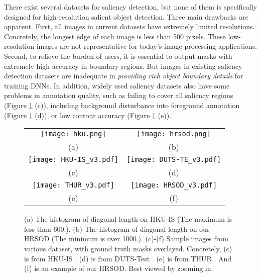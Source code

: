 \documentclass[10pt,twocolumn,letterpaper]{article}
\begin{document}
There exist several datasets for saliency detection, but none of them is specifically designed for high-resolution salient object detection. Three main drawbacks are apparent. First, all images in current datasets have extremely limited resolutions. Concretely, the longest edge of each image is less than 500 pixels. These low-resolution images are not representative
for today's image processing applications.
Second, to relieve the burden of users, it is essential to output masks with extremely high accuracy in boundary regions. But images in existing saliency detection datasets are inadequate in \emph{providing rich object boundary details} for training DNNs. In addition, widely used saliency datasets also have some problems in annotation quality, such as failing to cover all saliency regions (Figure \ref{fig:datset} (c)), including background disturbance into foreground annotation (Figure \ref{fig:datset} (d)), or low contour accuracy (Figure \ref{fig:datset} (e)).
\begin{figure}[!t]
    \centering
    \hspace{-2mm}
        \begin{tabular}{c@{\hspace{0.5mm}} c@{\hspace{0.5mm}}}
\texttt{[image: hku.png]}&
            \texttt{[image: hrsod.png]}\\
            (a)&(b)\\
            \texttt{[image: HKU-IS\_v3.pdf]}&
            \texttt{[image: DUTS-TE\_v3.pdf]}\\
            (c)&(d)\\
            \texttt{[image: THUR\_v3.pdf]}&
            \texttt{[image: HRSOD\_v3.pdf]}\\
            (e)&(f)\\
        \end{tabular}
\caption{(a) The histogram of diagonal length on HKU-IS \cite{li2015visual} (The maximum is less than 600.). (b) The histogram of diagonal length on our HRSOD (The minimum is over 1000.). (c)-(f) Sample images from various dataset, with ground truth masks overlayed. Concretely, (c) is from HKU-IS \cite{li2015visual}. (d) is from DUTS-Test \cite{wang2017}. (e) is from THUR \cite{cheng2014salientshape}. And (f) is an example of our HRSOD. Best viewed by zooming in.}
    \label{fig:datset}
    \vspace{-5mm}
\end{figure}
\end{document}

